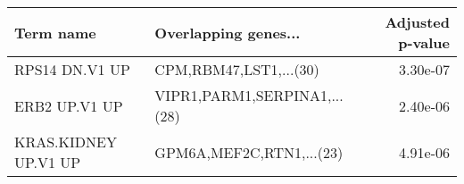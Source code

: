\begin{tabular}{llr}
\toprule
           Term name &         Overlapping genes... &  Adjusted p-value \\
\midrule
      RPS14 DN.V1 UP &       CPM,RBM47,LST1,...(30) &          3.30e-07 \\
       ERB2 UP.V1 UP & VIPR1,PARM1,SERPINA1,...(28) &          2.40e-06 \\
KRAS.KIDNEY UP.V1 UP &     GPM6A,MEF2C,RTN1,...(23) &          4.91e-06 \\
\bottomrule
\end{tabular}
